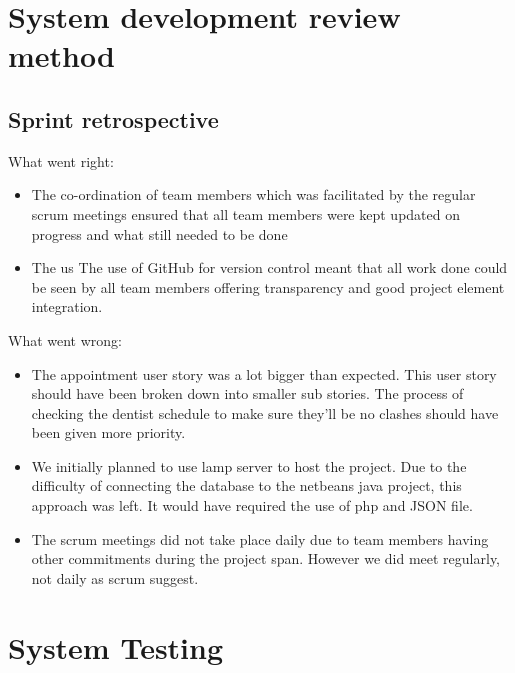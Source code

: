 \documentclass[11 pt]{article}
\begin{document}
\section{System development review method}
\subsection{Sprint retrospective}
What went right:
\begin{itemize}
\item
The co-ordination of team members which was facilitated by the regular scrum meetings ensured that all team members were kept updated on progress and what still needed to be done
\item
The us
The use of GitHub for version control meant that all work done could be seen by all team members offering transparency and good project element integration.

\end{itemize}
What went wrong:
\begin{itemize}
\item The appointment user story was a lot bigger than expected. This user story should have been broken down into smaller sub stories. The process of checking the dentist schedule to make sure they'll be no clashes should have been given more priority.
\item
We initially planned to use lamp server to host the project. Due to the difficulty of connecting the database to the netbeans java project, this approach was left. It would have required the use of php and JSON file.
\item
The scrum meetings did not take place daily due to team members having other commitments during the project span. However we did meet regularly, not daily as scrum suggest.


\end{itemize}

\section{System Testing}
\end{document}
